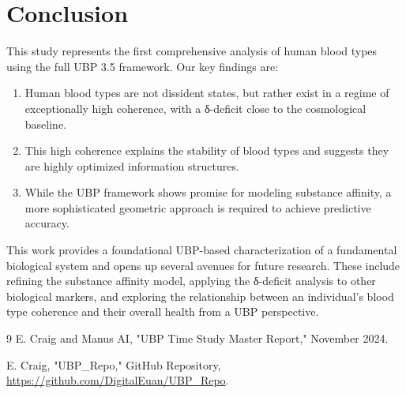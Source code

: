 \documentclass{article}
\begin{document}
\section{Conclusion}

This study represents the first comprehensive analysis of human blood types using the full UBP 3.5 framework. Our key findings are:

\begin{enumerate}
    \item Human blood types are not dissident states, but rather exist in a regime of exceptionally high coherence, with a δ-deficit close to the cosmological baseline.
    \item This high coherence explains the stability of blood types and suggests they are highly optimized information structures.
    \item While the UBP framework shows promise for modeling substance affinity, a more sophisticated geometric approach is required to achieve predictive accuracy.
\end{enumerate}

This work provides a foundational UBP-based characterization of a fundamental biological system and opens up several avenues for future research. These include refining the substance affinity model, applying the δ-deficit analysis to other biological markers, and exploring the relationship between an individual's blood type coherence and their overall health from a UBP perspective.

\begin{thebibliography}{9}
E. Craig and Manus AI, "UBP Time Study Master Report," November 2024.

E. Craig, "UBP_Repo," GitHub Repository, \url{https://github.com/DigitalEuan/UBP_Repo}.

\end{thebibliography}
\end{document}
